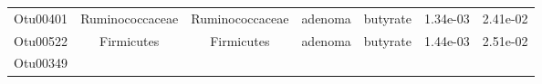 \documentclass[11pt,]{article}
\begin{document}
\begin{longtable}[]{@{}ccccccc@{}}
\begin{minipage}[t]{0.09\columnwidth}\centering\strut
Otu00401\strut
\end{minipage} & \begin{minipage}[t]{0.17\columnwidth}\centering\strut
Ruminococcaceae\strut
\end{minipage} & \begin{minipage}[t]{0.17\columnwidth}\centering\strut
Ruminococcaceae\strut
\end{minipage} & \begin{minipage}[t]{0.09\columnwidth}\centering\strut
adenoma\strut
\end{minipage} & \begin{minipage}[t]{0.11\columnwidth}\centering\strut
butyrate\strut
\end{minipage} & \begin{minipage}[t]{0.09\columnwidth}\centering\strut
1.34e-03\strut
\end{minipage} & \begin{minipage}[t]{0.09\columnwidth}\centering\strut
2.41e-02\strut
\end{minipage}\tabularnewline
\begin{minipage}[t]{0.09\columnwidth}\centering\strut
Otu00522\strut
\end{minipage} & \begin{minipage}[t]{0.17\columnwidth}\centering\strut
Firmicutes\strut
\end{minipage} & \begin{minipage}[t]{0.17\columnwidth}\centering\strut
Firmicutes\strut
\end{minipage} & \begin{minipage}[t]{0.09\columnwidth}\centering\strut
adenoma\strut
\end{minipage} & \begin{minipage}[t]{0.11\columnwidth}\centering\strut
butyrate\strut
\end{minipage} & \begin{minipage}[t]{0.09\columnwidth}\centering\strut
1.44e-03\strut
\end{minipage} & \begin{minipage}[t]{0.09\columnwidth}\centering\strut
2.51e-02\strut
\end{minipage}\tabularnewline
\begin{minipage}[t]{0.09\columnwidth}\centering\strut
Otu00349\strut
\end{minipage} & \begin{minipage}[t]{0.17\columnwidth}\centering\strut

\end{minipage}
\end{longtable}
\end{document}
